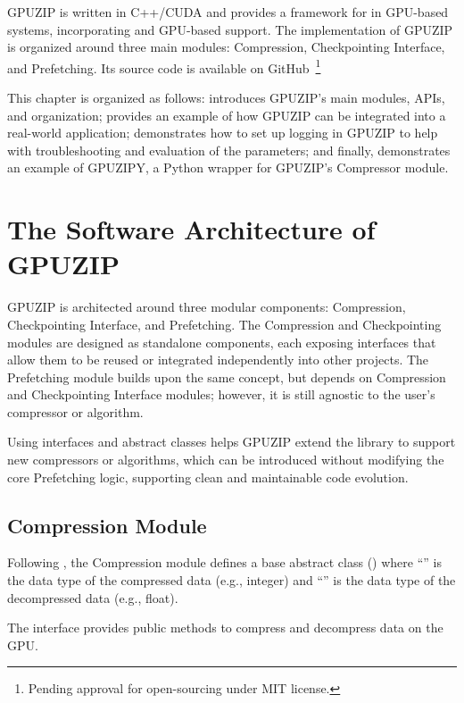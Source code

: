 \documentclass[Ingles,Final]{ic-tese-v3}
\begin{document}
GPUZIP is written in C++/CUDA and provides a framework for \checkpointing in GPU-based systems, incorporating \checkpointprefetching and GPU-based \compression support. The implementation of GPUZIP is organized around three main modules: Compression, Checkpointing Interface, and Prefetching. Its source code is available on GitHub~\cite{githubrepo}\footnote{Pending approval for open-sourcing under MIT license.}

This chapter is organized as follows:  introduces GPUZIP's main modules, APIs, and organization;  provides an example of how GPUZIP can be integrated into a real-world application;  demonstrates how to set up logging in GPUZIP to help with troubleshooting and evaluation of the parameters; and finally,  demonstrates an example of GPUZIPY, a Python wrapper for GPUZIP's Compressor module.

\section{The Software Architecture of GPUZIP}
\label{sec:ossmodules}
GPUZIP is architected around three modular components: Compression, Checkpointing Interface, and Prefetching. The Compression and Checkpointing modules are designed as standalone components, each exposing interfaces that allow them to be reused or integrated independently into other projects. The Prefetching module builds upon the same concept, but depends on Compression and Checkpointing Interface modules; however, it is still agnostic to the user's compressor or \checkpointing algorithm.

Using interfaces and abstract classes helps GPUZIP extend the library to support new compressors or \checkpointing algorithms, which can be introduced without modifying the core Prefetching logic, supporting clean and maintainable code evolution.

\subsection{Compression Module}

Following , the Compression module defines a base abstract class () where ``'' is the data type of the compressed data (e.g., integer) and ``'' is the data type of the decompressed data (e.g., float). 

The  interface provides public methods to compress and decompress data on the GPU.
\end{document}
